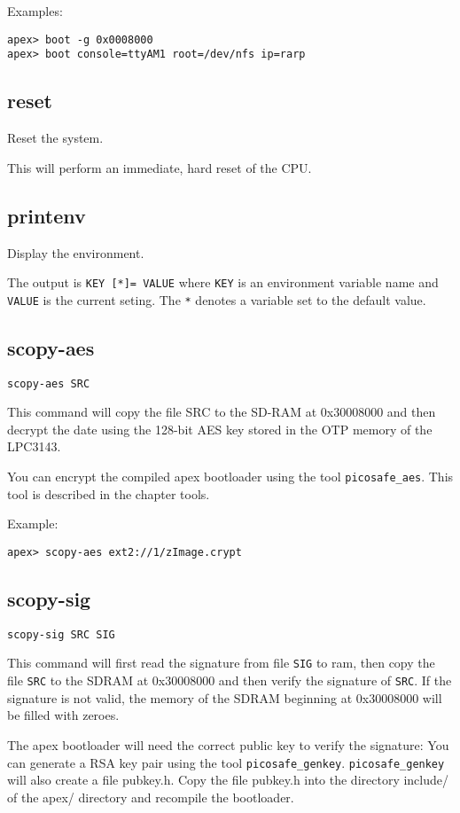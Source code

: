 Examples:
\begin{lstlisting}
apex> boot -g 0x0008000 
apex> boot console=ttyAM1 root=/dev/nfs ip=rarp
\end{lstlisting}

\subsection{reset}
Reset the system. 

This will perform an immediate, hard reset of the CPU.

\subsection{printenv}
Display the environment.

The output is \texttt{KEY [*]= VALUE} where \texttt{KEY} is an environment
variable name and \texttt{VALUE} is the current seting.  The \texttt{*} denotes
a variable set to the default value.

\subsection{scopy-aes}
\texttt{scopy-aes SRC}

This command will copy the file SRC to the SD-RAM at 0x30008000 and then
decrypt the date using the 128-bit AES key stored in the OTP memory of the
LPC3143.

You can encrypt the compiled apex bootloader using the tool
\texttt{picosafe\_aes}. This tool is described in the chapter tools.

Example:
\begin{lstlisting}
apex> scopy-aes ext2://1/zImage.crypt
\end{lstlisting}

\subsection{scopy-sig}
\texttt{scopy-sig SRC SIG}

This command will first read the signature from file \texttt{SIG} to ram, then copy the
file \texttt{SRC} to the SDRAM at 0x30008000 and then verify the signature of \texttt{SRC}. If
the signature is not valid, the memory of the SDRAM beginning at 0x30008000
will be filled with zeroes.

The apex bootloader will need the correct public key to verify the signature:
You can generate a RSA key pair using the tool \texttt{picosafe\_genkey}.
\texttt{picosafe\_genkey} will also create a file pubkey.h. Copy the file
pubkey.h into the directory include/ of the apex/ directory and recompile the
bootloader.

